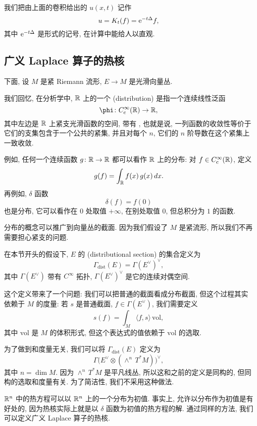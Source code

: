 我们把由上面的卷积给出的 $u (x, t)$ 记作
\[ u = K_t (f) = \mathrm{e}^{-t \Delta} f, \]
其中 $\mathrm{e}^{-t \Delta}$ 是形式的记号, 在计算中能给人以直观.


\subsection{广义 Laplace 算子的热核}

下面, 设 $M$ 是紧 Riemann 流形, $E \to M$ 是光滑向量丛.

我们回忆, 在分析学中, $\mathbb{R}$ 上的一个 (distribution)
是指一个连续线性泛函
\[ \phi \: C_{\mathrm{c}}^\infty (\bbR) \to \bbR, \]
其中左边是 $\mathbb{R}$ 上紧支光滑函数的空间, 带有 ,
也就是说, 一列函数的收敛性等价于它们的支集包含于一个公共的紧集,
并且对每个 $n$, 它们的 $n$ 阶导数在这个紧集上一致收敛.

例如, 任何一个连续函数 $g \colon \mathbb{R} \to \mathbb{R}$ 都可以看作 $\mathbb{R}$ 上的分布:
对 $f \in C_{\mathrm{c}}^\infty (\mathbb{R})$, 定义
\[ g (f) = \int_{\mathbb{R}} f(x) \, g(x) \, dx. \]
再例如, $\delta$ 函数
\[ \delta (f) = f (0) \]
也是分布, 它可以看作在 $0$ 处取值 $+\infty$, 在别处取值 $0$, 但总积分为 $1$ 的函数.

分布的概念可以推广到向量丛的截面.
因为我们假设了 $M$ 是紧流形, 所以我们不再需要担心紧支的问题.

\begin{definition}
    在本节开头的假设下, $E$ 的 (distributional section) 的集合定义为
    \[ \Gamma_{\mathrm{dist}} (E) = \Gamma (E^\vee) ^\vee, \]
    其中 $\Gamma (E^\vee)$ 带有 $C^\infty$ 拓扑,
    $\Gamma (E^\vee) ^\vee$ 是它的连续对偶空间.
\end{definition}

\begin{remark}
    这个定义带来了一个问题: 我们可以把普通的截面看成分布截面,
    但这个过程其实依赖于 $M$ 的度量: 若 $s$ 是普通截面, $f \in \Gamma(E^{\vee})$,
    我们需要定义
    \[ s(f) = \int_M \langle f, s \rangle \, \mathrm{vol} , \]
    其中 $\mathrm{vol}$ 是 $M$ 的体积形式, 
    但这个表达式的值依赖于 $\mathrm{vol}$ 的选取.
    
    为了做到和度量无关, 我们可以将 $\Gamma_{\mathrm{dist}} (E)$ 定义为
    \[ \Gamma \bigl( E^\vee \otimes (\wedge^n \, T^* M) \bigr) ^\vee, \]
    其中 $n = \dim M$. 因为 $\wedge^n \, T^* M$ 是平凡线丛,
    所以这和之前的定义是同构的, 但同构的选取和度量有关.
    为了简洁性, 我们不采用这种做法. \varqed
\end{remark}

$\mathbb{R}^n$ 中的热方程可以以 $\mathbb{R}^n$ 上的一个分布为初值.
事实上, 允许以分布作为初值是有好处的,
因为热核实际上就是以 $\delta$ 函数为初值的热方程的解.
通过同样的方法, 我们可以定义广义 Laplace 算子的热核.

